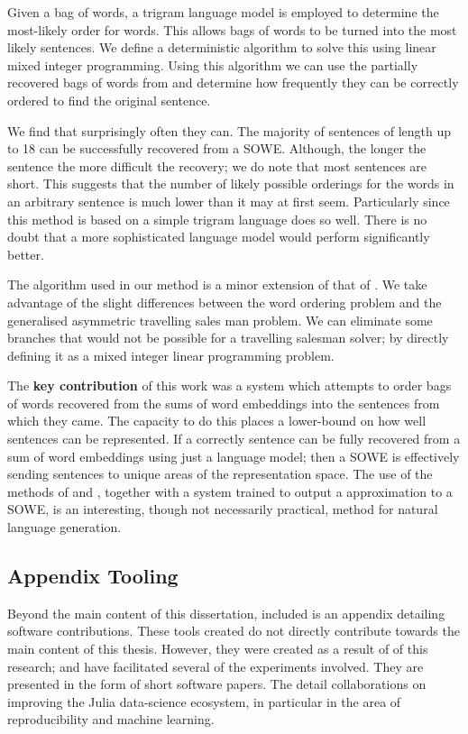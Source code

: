 \documentclass{book}
\begin{document}
Given a bag of words,
a trigram language model is employed to determine the most-likely order for words.
This allows bags of words to be turned into the most likely sentences.
We define a deterministic algorithm to solve this using linear mixed integer programming.
Using this algorithm we can use the partially recovered bags of words from  and determine how frequently they can be correctly ordered to find the original sentence.

We find that surprisingly often they can.
The majority of sentences of length up to 18 can be successfully recovered from a SOWE.
Although, the longer the sentence the more difficult the recovery;
we do note that most sentences are short.
This suggests that the number of likely possible orderings for the words in an arbitrary sentence is much lower than it may at first seem.
Particularly since this method is based on a simple trigram language does so well.
There is no doubt that a more sophisticated language model would perform significantly better.


The algorithm used in our method is a minor extension of that of \citet{Horvat2014}.
We take advantage of the slight differences between the word ordering problem and the generalised asymmetric travelling sales man problem.
We can eliminate some branches that would not be possible for a travelling salesman solver; by directly defining it as a mixed integer linear programming problem.


The \textbf{key contribution} of this work was a system which attempts to order bags of words recovered from the sums of word embeddings into the sentences from which they came.
The capacity to do this places a lower-bound on how well sentences can be represented.
If a correctly sentence can be fully recovered from a sum of word embeddings using just a language model;
then a SOWE is effectively sending sentences to unique areas of the representation space.
The use of the methods of  and ,
together with a system trained to output a approximation to a SOWE, is an interesting, though not necessarily practical, method for natural language generation.

\subsection*{ Appendix Tooling}
Beyond the main content of this dissertation,
included is an appendix detailing software contributions.
These tools created do not directly contribute towards the main content of this thesis.
However, they were created as a result of of this research;
and have facilitated several of the experiments involved.
They are presented in the form of short software papers.
The detail collaborations on improving the Julia \citep{Julia} data-science ecosystem,
in particular in the area of reproducibility and machine learning.
\end{document}
